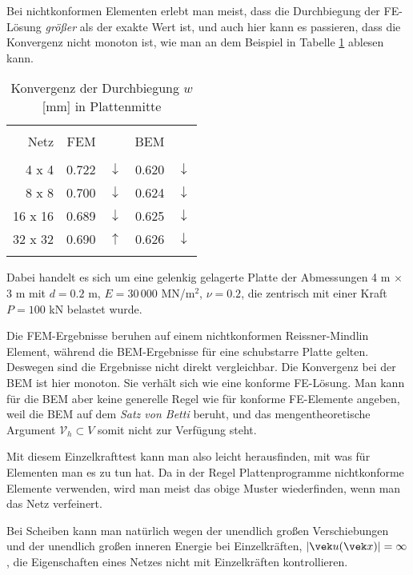 Bei nichtkonformen Elementen erlebt man meist, dass die Durchbiegung der FE-L\"{o}sung {\em
gr\"{o}{\ss}er\/} als der exakte Wert ist, und auch hier kann es passieren, dass die Konvergenz
nicht monoton ist, wie man an dem Beispiel in Tabelle \ref{TabwKon} ablesen kann.
\begin{table}
\caption{ Konvergenz der Durchbiegung $w$ [mm] in Plattenmitte} \label{TabwKon}
\begin{tabular}{rrrrr}
\noalign{\hrule\smallskip} \\[1mm]
      Netz & FEM  & & BEM             \\
\noalign{\hrule\smallskip}\\[1mm]
     4 x 4 &      0.722 &$\downarrow$    &  0.620 &$\downarrow$      \\
     8 x 8 &        0.700 & $\downarrow$ & 0.624  &$\downarrow$       \\
   16 x 16 &      0.689   &$\downarrow$  &0.625   &$\downarrow$     \\
   32 x 32 &       0.690  &$\uparrow$  &0.626   &$\downarrow$      \\[3mm]
\noalign{\hrule\smallskip}
\end{tabular}
 \end{table}
Dabei handelt es sich um eine gelenkig gelagerte Platte der Abmessungen 4 m $ \times $ 3
m mit $d = 0.2$ m, $E = 30\,000$ MN/m$^2$, $\nu = 0.2$, die zentrisch mit einer Kraft $P = 100$ kN
belastet wurde.

Die FEM-Ergebnisse beruhen auf einem nichtkonformen Reissner-Mindlin Element, w\"{a}hrend die
BEM-Ergebnisse f\"{u}r eine schubstarre Platte gelten. Deswegen sind die Ergebnisse nicht
direkt vergleichbar. Die Konvergenz bei der BEM ist hier monoton. Sie verh\"{a}lt sich wie
eine konforme FE-L\"{o}sung. Man kann f\"{u}r die BEM aber keine generelle Regel wie f\"{u}r
konforme FE-Elemente angeben, weil die BEM auf dem {\em Satz von Betti\/} beruht, und
das \hlq mengentheoretische\grq \,  Argument $\mathcal{V}_h \subset V$ somit nicht zur Verf\"{u}gung
steht.

Mit diesem Einzelkrafttest kann man also leicht herausfinden, mit was f\"{u}r Elementen man
es zu tun hat. Da in der Regel Plattenprogramme nichtkonforme Elemente verwenden, wird
man meist das obige Muster wiederfinden, wenn man das Netz verfeinert.

Bei Scheiben kann man nat\"{u}rlich wegen der unendlich gro{\ss}en Verschiebungen und der
unendlich gro{\ss}en inneren Energie bei Einzelkr\"{a}ften, $|\vek u(\vek x)| = \infty$, die
Eigenschaften eines Netzes nicht mit Einzelkr\"{a}ften kontrollieren.

